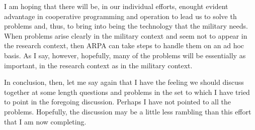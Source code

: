\documentclass{article}
\begin{document}
I am hoping that there will be, in our individual efforts, enought evident advantage in cooperative programming and operation to lead us to solve th problems and, thus, to bring into being the technology that the military needs. When problems arise clearly in the military context and seem not to appear in the research context, then ARPA can take steps to handle them on an ad hoc basis. As I say, however, hopefully, many of the problems will be essentially as important, in the research context as in the military context.

In conclusion, then, let me say again that I have the feeling we should discuss together at some length questions and problems in the set to which I have tried to point in the foregoing discussion. Perhaps I have not pointed to all the problems. Hopefully, the discussion may be a little less rambling than this effort that I am now completing.


% 

% 

% 
\end{document}
